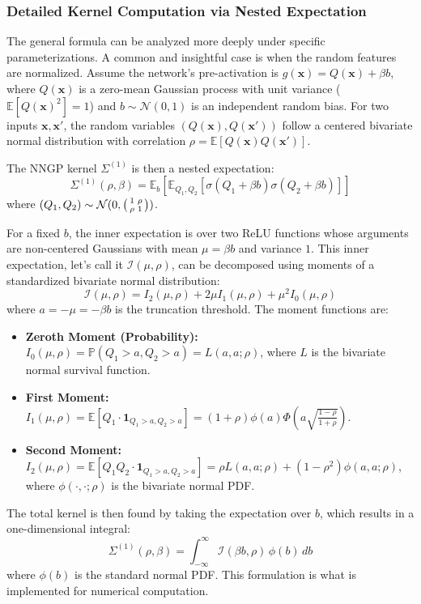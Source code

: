 \documentclass[a4paper]{article}
\begin{document}
\subsubsection{Detailed Kernel Computation via Nested Expectation}
The general formula can be analyzed more deeply under specific parameterizations. A common and insightful case is when the random features are normalized. Assume the network's pre-activation is $g(\bm{x}) = Q(\bm{x}) + \beta b$, where $Q(\bm{x})$ is a zero-mean Gaussian process with unit variance ($\mathbb{E}[Q(\bm{x})^2]=1$) and $b \sim \mathcal{N}(0,1)$ is an independent random bias. For two inputs $\bm{x}, \bm{x}'$, the random variables $(Q(\bm{x}), Q(\bm{x}'))$ follow a centered bivariate normal distribution with correlation $\rho = \mathbb{E}[Q(\bm{x})Q(\bm{x}')]$.

The NNGP kernel $\Sigma^{(1)}$ is then a nested expectation:
\begin{equation}
    \Sigma^{(1)}(\rho, \beta) = \mathbb{E}_{b} \left[ \mathbb{E}_{Q_1, Q_2} \left[ \sigma(Q_1 + \beta b) \sigma(Q_2 + \beta b) \right] \right]
\end{equation}
where $(Q_1, Q_2) \sim \mathcal{N}(0, \begin{psmallmatrix} 1 & \rho \\ \rho & 1 \end{psmallmatrix})$.

For a fixed $b$, the inner expectation is over two ReLU functions whose arguments are non-centered Gaussians with mean $\mu = \beta b$ and variance $1$. This inner expectation, let's call it $\mathcal{I}(\mu, \rho)$, can be decomposed using moments of a standardized bivariate normal distribution:
\begin{equation}
    \mathcal{I}(\mu, \rho) = I_2(\mu, \rho) + 2\mu I_1(\mu, \rho) + \mu^2 I_0(\mu, \rho)
\end{equation}
where $a = -\mu = -\beta b$ is the truncation threshold. The moment functions are:
\begin{itemize}
    \item \textbf{Zeroth Moment (Probability):} $I_0(\mu, \rho) = \mathbb{P}(Q_1 > a, Q_2 > a) = L(a, a; \rho)$, where $L$ is the bivariate normal survival function.
    \item \textbf{First Moment:} $I_1(\mu, \rho) = \mathbb{E}[Q_1 \cdot \mathbf{1}_{Q_1>a, Q_2>a}] = (1+\rho)\phi(a)\Phi\left(a\sqrt{\frac{1-\rho}{1+\rho}}\right)$.
    \item \textbf{Second Moment:} $I_2(\mu, \rho) = \mathbb{E}[Q_1 Q_2 \cdot \mathbf{1}_{Q_1>a, Q_2>a}] = \rho L(a, a; \rho) + (1-\rho^2)\phi(a, a; \rho)$, where $\phi(\cdot,\cdot;\rho)$ is the bivariate normal PDF.
\end{itemize}
The total kernel is then found by taking the expectation over $b$, which results in a one-dimensional integral:
\begin{equation}
    \Sigma^{(1)}(\rho, \beta) = \int_{-\infty}^{\infty} \mathcal{I}(\beta b, \rho) \, \phi(b) \, db
\end{equation}
where $\phi(b)$ is the standard normal PDF. This formulation is what is implemented for numerical computation.
\end{document}
